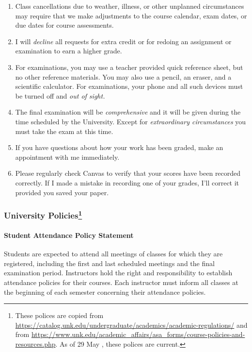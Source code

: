 \documentclass[12pt]{article}
\newcounter{ex}\setcounter{ex}{0}
\begin{document}
\begin{enumerate}
\item Class cancellations due to weather, illness, or other 
unplanned circumstances may require that we make  adjustments
to the course calendar, exam dates, or due dates for 
course assessments. 

\item I will \emph{decline} all requests for extra credit or for
redoing an assignment or examination to earn a higher grade.

\item For examinations, you may use a teacher provided quick reference sheet, 
but no other reference materials. You may also use a pencil, an eraser, 
and a scientific calculator. For examinations, your phone and all such
devices must be turned off and \emph{out of sight.} 

\item The final examination will be \emph{comprehensive} and it will be given 
during the  time scheduled by the University. Except for \emph{extraordinary circumstances}
you must take the exam at this time.
 
\item If you have questions about how your work has been graded, make an appointment with me immediately.

\item Please regularly check Canvas  to verify that your scores have 
been recorded correctly.  If I made a mistake in recording one of
your grades, I'll correct it provided you saved your paper.

\end{enumerate}

\subsubsection*{University Policies\footnote{These polices are
copied from \url{https://catalog.unk.edu/undergraduate/academics/academic-regulations/}
and from \url{https://www.unk.edu/academic_affairs/asa_forms/course-policies-and-resources.php}.
As of 29 May \the\year, these polices are current.}} 
\paragraph*{Student Attendance Policy Statement}

Students are expected to attend all meetings of classes for which they are 
registered, including the first and last scheduled meetings and the final 
examination period. Instructors hold the right and responsibility to 
establish attendance policies for their courses. Each instructor must 
inform all classes at the beginning of each semester concerning their 
attendance policies.
\end{document}
